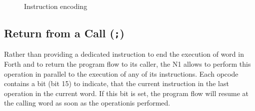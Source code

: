 \begin{figure}[!htb]
{{
    }
  }
  \caption{Instruction encoding}
  \label{opcodes:encoding}
\end{figure}

\subsection{Return from a Call (\texttt{;})}
\label{opcodes:rtc}

Rather than  providing a dedicated instruction to end the execution of 
word in Forth and to return the program flow to its caller, the N1 allows
to perform this operation in parallel to the execution of any of its
instructions. Each \gls{opcode} contains a bit (bit 15) to indicate, that the
current instruction in the last operation in the current word. If this bit
is set, the program flow will resume at the calling word as soon as the
operationis performed.

